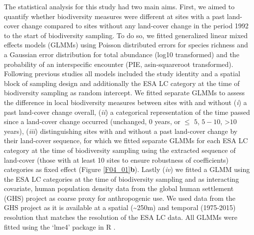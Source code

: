 The statistical analysis for this study had two main aims. First, we aimed to quantify whether biodiversity measures were different at sites with a past land-cover change compared to sites without any land-cover change in the period 1992 to the start of biodiversity sampling. To do so, we fitted generalized linear mixed effects models (GLMMs) using Poisson distributed errors for species richness and a Gaussian error distribution for total abundance (log10 transformed) and the probability of an interspecific encounter (PIE, asin-squareroot transformed). Following previous studies \citep{Newbold2015,Jung2016} all models included the study identity and a spatial block of sampling design and additionally the ESA LC category at the time of biodiversity sampling as random intercept. We fitted separate GLMMs to assess the difference in local biodiversity measures between sites with and without (\textit{i}) a past land-cover change overall, (\textit{ii}) a categorical representation of the time passed since a land-cover change occurred (unchanged, \ie $0$ years, or $\leq$ $5$, $5-10$, >$10$ years), (\textit{iii}) distinguishing sites with and without a past land-cover change by their land-cover sequence, for which we fitted separate GLMMs for each ESA LC category at the time of biodiversity sampling using the extracted sequence of land-cover (those with at least 10 sites to ensure robustness of coefficients) categories as fixed effect (Figure \ref{F04_01}\textbf{b}). Lastly (\textit{iv}) we fitted a GLMM using the ESA LC categories at the time of biodiversity sampling and as interacting covariate, human population density data from the global human settlement (GHS) project \citep{Pesaresi2013,Pesaresi2016} as coarse proxy for anthropogenic use. We used data from the GHS project as it is available at a spatial (\textasciitilde 250m) and temporal (1975-2015) resolution that matches the resolution of the ESA LC data. All GLMMs were fitted using the ‘lme4’ package \citep[ver. 1.1-18-1,][]{lme4} in R \citep[ver. 3.5, ][]{RTeam2014}.

